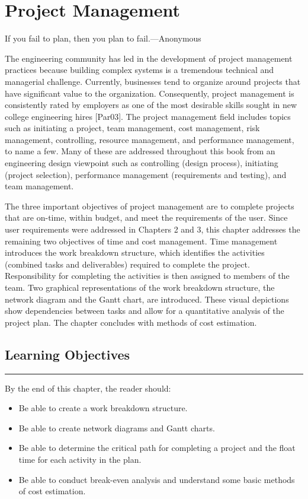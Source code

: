 \chapter{ Project Management}
\graphicspath{ {./chapter10/Fig} }

\begin{itquote}
If you fail to plan, then you plan to fail.---Anonymous
\end{itquote}

The engineering community has led in the development of project
management practices because building complex systems is a tremendous
technical and managerial challenge. Currently, businesses tend to
organize around projects that have significant value to the
organization. Consequently, project management is consistently rated by
employers as one of the most desirable skills sought in new college
engineering hires {[}Par03{]}. The project management field includes
topics such as initiating a project, team management, cost management,
risk management, controlling, resource management, and performance
management, to name a few. Many of these are addressed throughout this
book from an engineering design viewpoint such as controlling (design
process), initiating (project selection), performance management
(requirements and testing), and team management.

The three important objectives of project management are to complete
projects that are on-time, within budget, and meet the requirements of
the user. Since user requirements were addressed in Chapters 2 and 3,
this chapter addresses the remaining two objectives of time and cost
management. Time management introduces the work breakdown structure,
which identifies the activities (combined tasks and deliverables)
required to complete the project. Responsibility for completing the
activities is then assigned to members of the team. Two graphical
representations of the work breakdown structure, the network diagram and
the Gantt chart, are introduced. These visual depictions show
dependencies between tasks and allow for a quantitative analysis of the
project plan. The chapter concludes with methods of cost estimation.

\section*{Learning Objectives}
\noindent\rule{\linewidth}{1pt}
By the end of this chapter, the reader should:

\begin{itemize}
\item
  Be able to create a work breakdown structure.
\item
  Be able to create network diagrams and Gantt charts.
\item
  Be able to determine the critical path for completing a project and
  the float time for each activity in the plan.
\item
  Be able to conduct break-even analysis and understand some basic
  methods of cost estimation.
\end{itemize}

